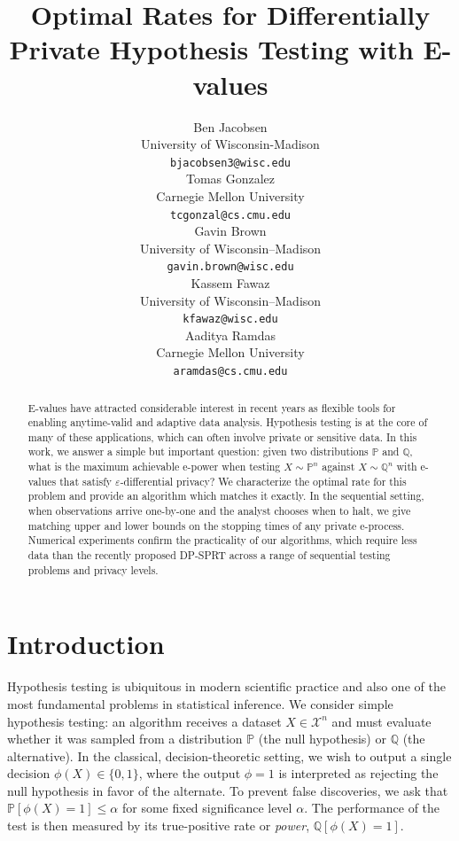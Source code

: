 \documentclass{article}
\title{Optimal Rates for Differentially Private Hypothesis Testing with E-values}
\author{%
  Ben Jacobsen \\
  University of Wisconsin-Madison\\
  \texttt{bjacobsen3@wisc.edu} \\
  \And 
  Tomas Gonzalez \\
  Carnegie Mellon University\\
  \texttt{tcgonzal@cs.cmu.edu} \\
  \And 
  Gavin Brown \\
  University of Wisconsin--Madison \\
  \texttt{gavin.brown@wisc.edu} \\
  \And 
  Kassem Fawaz \\
  University of Wisconsin--Madison \\
  \texttt{kfawaz@wisc.edu} \\
  \And 
  Aaditya Ramdas \\
  Carnegie Mellon University \\
  \texttt{aramdas@cs.cmu.edu}
}
\newcommand{\Null}{\mathbb{P}}
\newcommand{\Alt}{\mathbb{Q}}
\newcommand{\cX}{\mathcal{X}}
\begin{document}
\maketitle


\begin{abstract}
  E-values have attracted considerable interest in recent years as flexible tools for enabling anytime-valid and adaptive data analysis.
  Hypothesis testing is at the core of many of these applications, which can often involve private or sensitive data.
  In this work, we answer a simple but important question: given two distributions $\mathbb{P}$ and $\mathbb{Q}$, 
  what is the maximum achievable e-power when testing $X\sim \mathbb{P}^n$ against $X\sim\mathbb{Q}^n$ with e-values that satisfy $\varepsilon$-differential privacy? 
  We characterize the optimal rate for this problem and provide an algorithm which matches it exactly.
  In the sequential setting, when observations arrive one-by-one and the analyst chooses when to halt, we give matching upper and lower bounds on the stopping times of any private e-process.
  Numerical experiments confirm the practicality of our algorithms, which require less data than the recently proposed DP-SPRT across a range of sequential testing problems and privacy levels.
\end{abstract}

\section{Introduction}

Hypothesis testing is ubiquitous in modern scientific practice and also one of the most fundamental problems in statistical inference. 
We consider simple hypothesis testing: an algorithm receives a dataset $X\in \cX^n$ and must evaluate whether it was sampled from a distribution $\Null$ (the null hypothesis) or $\Alt$ (the alternative).
In the classical, decision-theoretic setting, we wish to output a single decision $\phi(X) \in \lbrace 0,1 \rbrace$, where the output $\phi=1$ is interpreted as rejecting the null hypothesis in favor of the alternate. 
To prevent false discoveries, we ask that $\Null[\phi(X) = 1] \leq \alpha$ for some fixed significance level $\alpha$. 
The performance of the test is then measured by its true-positive rate or \emph{power}, $\Alt[\phi(X) = 1]$.
\end{document}
